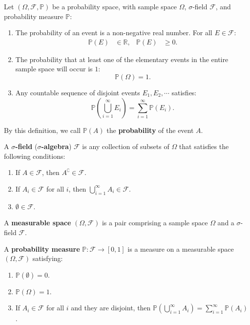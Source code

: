 \documentclass{huhtakm-template-book-v2}
\newcommand{\prob}{\mathbb{P}}
\begin{document}
    \begin{sdefn}
        Let $(\Omega, \mathcal{F}, \prob)$ be a probability space, with sample space $\Omega$, $\sigma$-field $\mathcal{F}$, and probability measure $\prob$:
        \begin{enumerate}
            \item The probability of an event is a non-negative real number. For all $E \in \mathcal{F}$:
            \begin{align*}
                \prob(E) &\in \mathbb{R}, & \prob(E) &\geq 0.
            \end{align*}
            \item The probability that at least one of the elementary events in the entire sample space will occur is $1$:
            \begin{equation*}
                \prob(\Omega) = 1.
            \end{equation*}
            \item Any countable sequence of disjoint events $E_{1}, E_{2}, \cdots$ satisfies:
            \begin{equation*}
                \prob\left(\bigcup_{i = 1}^{\infty}E_{i}\right) = \sum_{i = 1}^{\infty}\prob(E_{i}).
            \end{equation*}
        \end{enumerate}
        By this definition, we call $\prob(A)$ the \textbf{probability} of the event $A$.
    \end{sdefn}
    \begin{sdefn}
        A \textbf{$\sigma$-field} (\textbf{$\sigma$-algebra}) $\mathcal{F}$ is any collection of subsets of $\Omega$ that satisfies the following conditions:
        \begin{enumerate}
            \item If $A \in \mathcal{F}$, then $A^{\complement} \in \mathcal{F}$.
            \item If $A_{i} \in \mathcal{F}$ for all $i$, then $\bigcup_{i = 1}^{\infty}A_{i} \in \mathcal{F}$.
            \item $\emptyset \in \mathcal{F}$.
        \end{enumerate}
    \end{sdefn}
    \begin{sdefn}
        A \textbf{measurable space} $(\Omega, \mathcal{F})$ is a pair comprising a sample space $\Omega$ and a $\sigma$-field $\mathcal{F}$.
    \end{sdefn}
    \begin{sdefn}
        A \textbf{probability measure} $\prob: \mathcal{F} \to [0,1]$ is a measure on a measurable space $(\Omega, \mathcal{F})$ satisfying:
        \begin{enumerate}
            \item $\prob(\emptyset) = 0$.
            \item $\prob(\Omega) = 1$.
            \item If $A_{i} \in \mathcal{F}$ for all $i$ and they are disjoint, then $\prob\left(\bigcup_{i = 1}^{\infty}A_{i}\right) = \sum_{i = 1}^{\infty}\prob(A_{i})$.
        \end{enumerate}
    \end{sdefn}
\end{document}
